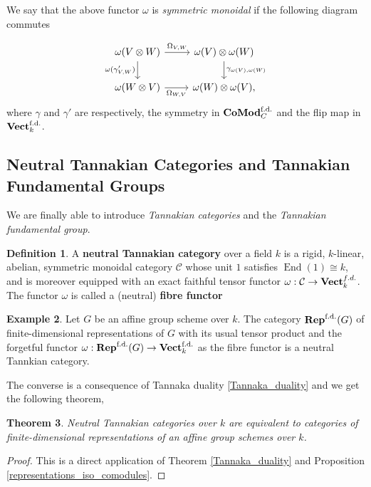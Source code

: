 \documentclass{article}
\theoremstyle{plain}
\newtheorem{theorem}{Theorem}[subsection]
\theoremstyle{definition}
\newtheorem{definition}[theorem]{Definition}
\newtheorem{example}[theorem]{Example}
\DeclareMathOperator{\End}{End}
\DeclareMathOperator{\Vect}{\bf{Vect}}
\DeclareMathOperator{\Rep}{\bf{Rep}}
\DeclareMathOperator{\Comod}{\bf{CoMod}}
\begin{document}
\noindent We say that the above functor $\omega$ is \textit{symmetric monoidal} if the following diagram commutes 

\[
\begin{tikzcd}
    \omega(V\otimes W)
    \arrow[r,"\Omega_{V,W}"]
    \arrow[d, "\omega(\gamma'_{V,W})"']
    &
    \omega(V)\otimes \omega(W)
    \arrow[d, "\gamma_{\omega(V),\omega(W)}"] \\
    \omega(W\otimes V) \arrow[r,"\Omega_{W,V}"'] & 
    \omega(W)\otimes \omega(V),
\end{tikzcd}
\]
where $\gamma$ and $\gamma'$ are respectively, the symmetry in $\Comod_C^{\text{f.d.}}$ and the flip map in $\Vect^{\text{f.d.}}_k$.

\subsection{Neutral Tannakian Categories and Tannakian Fundamental Groups}

We are finally able to introduce \textit{Tannakian categories} and the \textit{Tannakian fundamental group}.

\begin{definition}
    A \textbf{neutral Tannakian category} over a field $k$ is a rigid, $k$-linear, abelian, symmetric monoidal category $\mathcal{C}$ whose unit $1$ satisfies $\End(1) \cong k$, and is moreover equipped with an exact faithful tensor functor $\omega :\mathcal{C}\rightarrow \Vect^{f.d.}_k$. The functor $\omega$ is called a (neutral) \textbf{fibre functor}
\end{definition}

\begin{example}
    Let $G$ be an affine group scheme over $k$.
    The category $\Rep^{\text{f.d.}}(G)$ of finite-dimensional representations of $G$ with its usual tensor product and the forgetful functor $\omega:\Rep^{\text{f.d.}}(G)\rightarrow \Vect^{\text{f.d.}}_k$ as the fibre functor is a neutral Tannkian category.
\end{example}

\noindent The converse is a consequence of Tannaka duality \ref{Tannaka_duality} and we get the following theorem,

\begin{theorem}
    Neutral Tannakian categories over $k$ are equivalent to categories of finite-dimensional representations of an affine group schemes over $k$.
\end{theorem}
\begin{proof}
    This is a direct application of Theorem \ref{Tannaka_duality} and Proposition \ref{representations_iso_comodules}.
\end{proof}
\end{document}
